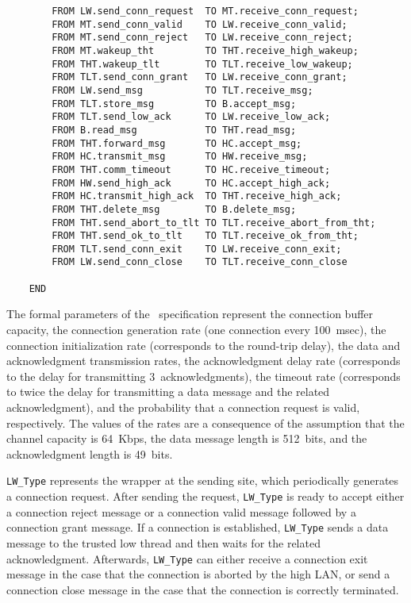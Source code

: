 \begin{verbatim}
        FROM LW.send_conn_request  TO MT.receive_conn_request;
        FROM MT.send_conn_valid    TO LW.receive_conn_valid;
        FROM MT.send_conn_reject   TO LW.receive_conn_reject;
        FROM MT.wakeup_tht         TO THT.receive_high_wakeup;
        FROM THT.wakeup_tlt        TO TLT.receive_low_wakeup;
        FROM TLT.send_conn_grant   TO LW.receive_conn_grant;
        FROM LW.send_msg           TO TLT.receive_msg;
        FROM TLT.store_msg         TO B.accept_msg;
        FROM TLT.send_low_ack      TO LW.receive_low_ack;
        FROM B.read_msg            TO THT.read_msg;
        FROM THT.forward_msg       TO HC.accept_msg;
        FROM HC.transmit_msg       TO HW.receive_msg;
        FROM THT.comm_timeout      TO HC.receive_timeout;
        FROM HW.send_high_ack      TO HC.accept_high_ack;
        FROM HC.transmit_high_ack  TO THT.receive_high_ack;
        FROM THT.delete_msg        TO B.delete_msg;
        FROM THT.send_abort_to_tlt TO TLT.receive_abort_from_tht;
        FROM THT.send_ok_to_tlt    TO TLT.receive_ok_from_tht;
        FROM TLT.send_conn_exit    TO LW.receive_conn_exit;
        FROM LW.send_conn_close    TO TLT.receive_conn_close

    END
	\end{verbatim}

The formal parameters of the \aemilia\ specification represent the connection buffer capacity, the
connection generation rate (one connection every 100~msec), the connection initialization rate (corresponds
to the round-trip delay), the data and acknowledgment transmission rates, the acknowledgment delay rate
(corresponds to the delay for transmitting 3~acknowledgments), the timeout rate (corresponds to twice the
delay for transmitting a data message and the related acknowledgment), and the probability that a connection
request is valid, respectively. The values of the rates are a consequence of the assumption that the channel
capacity is 64~Kbps, the data message length is 512~bits, and the acknowledgment length is 49~bits.

{\tt LW\_Type} represents the wrapper at the sending site, which periodically generates a connection
request. After sending the request, {\tt LW\_Type} is ready to accept either a connection reject message or
a connection valid message followed by a connection grant message. If a connection is established,
{\tt LW\_Type} sends a data message to the trusted low thread and then waits for the related acknowledgment.
Afterwards, {\tt LW\_Type} can either receive a connection exit message in the case that the connection is
aborted by the high LAN, or send a connection close message in the case that the connection is correctly
terminated.

